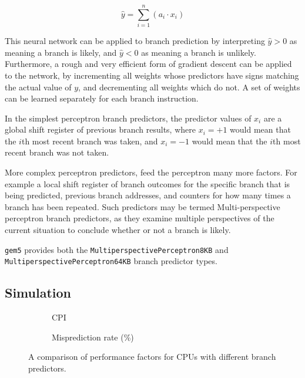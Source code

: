 \begin{equation}
    \hat{y} = \sum_{i=1}^{n} \left( a_i \cdot x_i \right)
    \label{eq:perceptron}
\end{equation}

This neural network can be applied to branch prediction by interpreting
\(\hat{y} > 0\) as meaning a branch is likely, and \(\hat{y} < 0\) as meaning
a branch is unlikely.
Furthermore, a rough and very efficient form of gradient
descent can be applied to the network, by incrementing all weights whose predictors
have signs matching the actual value of \(y\), and decrementing all weights which
do not.
A set of weights can be learned separately for each branch
instruction.~\cite{Jimenez2001}

In the simplest perceptron branch predictors, the predictor values of \(x_i\)
are a global shift register of previous branch results, where \(x_i = +1\) would
mean that the \(i\)th most recent branch was taken, and \(x_i = -1\) would
mean that the \(i\)th most recent branch was not taken.

More complex perceptron predictors, feed the perceptron many more
factors. For example a local shift register of branch outcomes for the specific
branch that is being predicted, previous branch addresses, and counters for
how many times a branch has been repeated.
Such predictors may be termed
Multi-perspective perceptron branch predictors, as they examine multiple
perspectives of the current situation to conclude whether or not a branch
is likely.~\cite{Jimenez2014}

\texttt{gem5} provides both the \texttt{MultiperspectivePerceptron8KB}
and \texttt{MultiperspectivePerceptron64KB} branch predictor types.


\subsection{Simulation}
\begin{figure}[b!]%
\hfill%
\begin{subfigure}{.4\textwidth}
    \centering
    
    \caption{CPI}
    \label{fig:partd-cpi}
\end{subfigure}%
\hfill%
\begin{subfigure}{.4\textwidth}
    \centering
    
    \caption{Misprediction rate (\%)}
    \label{fig:partd-mispredict}
\end{subfigure}%
\hfill\null%
\caption{A comparison of performance factors for CPUs with different branch predictors.}
\label{fig:partd-factors}
\end{figure}

